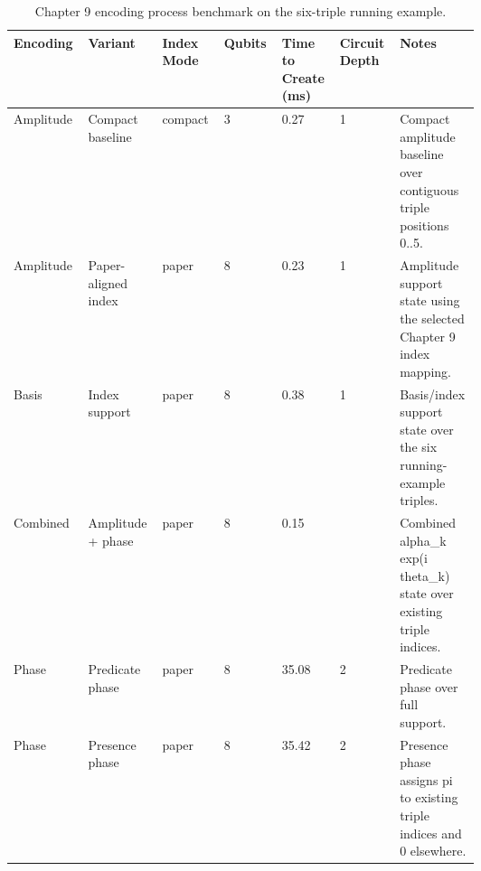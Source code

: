 \begin{table}[t]
\centering
\scriptsize
\setlength{\tabcolsep}{2pt}
\renewcommand{\arraystretch}{1.08}
\caption{Chapter 9 encoding process benchmark on the six-triple running example.}
\label{tab:chapter9-encoding-process}
\begin{tabular}{@{}p{0.085\linewidth}p{0.085\linewidth}p{0.085\linewidth}p{0.085\linewidth}p{0.085\linewidth}p{0.085\linewidth}p{0.085\linewidth}@{}}
\hline
Encoding & Variant & Index Mode & Qubits & Time to Create (ms) & Circuit Depth & Notes \\
\hline
Amplitude & Compact baseline & compact & 3 & 0.27 & 1 & Compact amplitude baseline over contiguous triple positions 0..5. \\
Amplitude & Paper-aligned index & paper & 8 & 0.23 & 1 & Amplitude support state using the selected Chapter 9 index mapping. \\
Basis & Index support & paper & 8 & 0.38 & 1 & Basis/index support state over the six running-example triples. \\
Combined & Amplitude + phase & paper & 8 & 0.15 &  & Combined alpha\_k exp(i theta\_k) state over existing triple indices. \\
Phase & Predicate phase & paper & 8 & 35.08 & 2 & Predicate phase over full support. \\
Phase & Presence phase & paper & 8 & 35.42 & 2 & Presence phase assigns pi to existing triple indices and 0 elsewhere. \\
\hline
\end{tabular}
\end{table}
